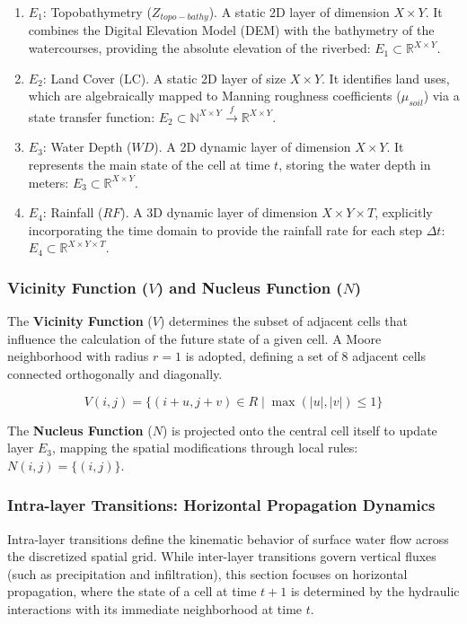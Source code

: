 \begin{enumerate}
    \item $E_1$: Topobathymetry ($Z_{topo-bathy}$). A static 2D layer of dimension $X \times Y$. It combines the Digital 
    Elevation Model (DEM) with the bathymetry of the watercourses, providing the absolute elevation of the riverbed: 
    $E_1 \subset \mathbb{R}^{X \times Y}$.
    \item $E_2$: Land Cover (LC). A static 2D layer of size $X \times Y$. It identifies land uses, which are algebraically 
    mapped to Manning roughness coefficients ($\mu_{soil}$) via a state transfer function: 
    $E_2 \subset \mathbb{N}^{X \times Y} \xrightarrow{f} \mathbb{R}^{X \times Y}$.
    \item $E_3$: Water Depth ($WD$). A 2D dynamic layer of dimension $X \times Y$. It represents the main state of the cell 
    at time $t$, storing the water depth in meters: $E_3 \subset \mathbb{R}^{X \times Y}$.
    \item $E_4$: Rainfall ($RF$). A 3D dynamic layer of dimension $X \times Y \times T$, explicitly incorporating the time 
    domain to provide the rainfall rate for each step $\Delta t$: $E_4 \subset \mathbb{R}^{X \times Y \times T}$.
\end{enumerate}


\subsubsection{Vicinity Function ($V$) and Nucleus Function ($N$)}

The \textbf{Vicinity Function} ($V$) determines the subset of adjacent cells that influence the calculation of the future state of a 
given cell. A Moore neighborhood with radius $r=1$ is adopted, defining a set of 8 adjacent cells connected orthogonally and 
diagonally.

$$V(i,j) = \{ (i+u, j+v) \in R \mid \max(|u|, |v|) \le 1 \}$$

The \textbf{Nucleus Function} ($N$) is projected onto the central cell itself to update layer $E_3$, mapping the spatial 
modifications through local rules: $N(i,j) = \{ (i,j) \}$.


\subsubsection{Intra-layer Transitions: Horizontal Propagation Dynamics}

Intra-layer transitions define the kinematic behavior of surface water flow across the discretized spatial grid. While inter-layer 
transitions govern vertical fluxes (such as precipitation and infiltration), this section focuses on horizontal propagation, where the 
state of a cell at time $t+1$ is determined by the hydraulic interactions with its immediate neighborhood at time $t$.

